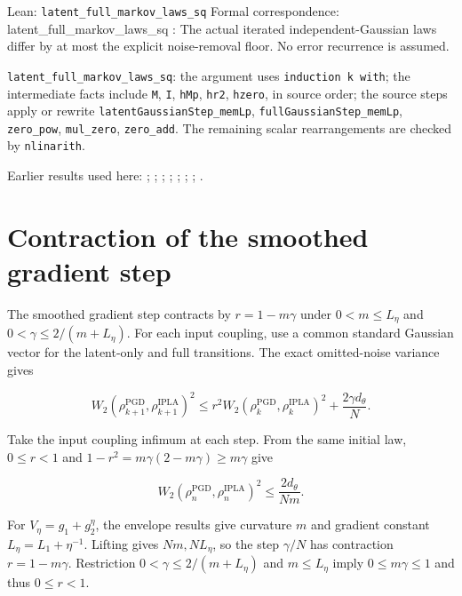 \documentclass[11pt,a4paper]{article}
\begin{document}
\begin{leanbox}{Lean: \texttt{latent\_\allowbreak{}full\_\allowbreak{}markov\_\allowbreak{}laws\_\allowbreak{}sq}}
Formal correspondence: latent\_full\_markov\_laws\_sq : The actual iterated independent-Gaussian laws differ by at most the explicit noise-removal floor. No error recurrence is assumed.



\texttt{latent\_\allowbreak{}full\_\allowbreak{}markov\_\allowbreak{}laws\_\allowbreak{}sq}: the argument uses \texttt{induction k with}; the intermediate facts include \texttt{M}, \texttt{I}, \texttt{h\allowbreak{}Mp}, \texttt{hr2}, \texttt{hzero}, in source order; the source steps apply or rewrite \texttt{latent\allowbreak{}Gaussian\allowbreak{}Step\_\allowbreak{}mem\allowbreak{}Lp}, \texttt{full\allowbreak{}Gaussian\allowbreak{}Step\_\allowbreak{}mem\allowbreak{}Lp}, \texttt{zero\_\allowbreak{}pow}, \texttt{mul\_\allowbreak{}zero}, \texttt{zero\_\allowbreak{}add}. The remaining scalar rearrangements are checked by \texttt{nlinarith}.
\end{leanbox}


Earlier results used here: \cite[Section~3.15.3]{LangevinLean2026ULASC}; \cite[Section~3.17.3]{LangevinLean2026ULASC}; \cite[Section~3.17.4]{LangevinLean2026ULASC}; \cite[Section~3.17.9]{LangevinLean2026ULASC}; \cite[Section~3.21.2]{LangevinLean2026ULASC}; \cite[Section~3.33.11]{LangevinLean2026ULASC}; \cite[Section~3.33.6]{LangevinLean2026ULASC}; \cite[Section~3.1.1]{LangevinLean2026IPLA}.

\section{\texorpdfstring{Contraction of the smoothed gradient step}{Contraction of the smoothed gradient step}}


The smoothed gradient step contracts by \(r=1-m\gamma\) under \(0<m\le L_\eta\) and \(0<\gamma\le2/(m+L_\eta)\). For each input coupling, use a common standard Gaussian vector for the latent-only and full transitions. The exact omitted-noise variance gives

\[
W_2(\rho^{\mathrm{PGD}}_{k+1},\rho^{\mathrm{IPLA}}_{k+1})^2
 \le r^2 W_2(\rho^{\mathrm{PGD}}_k,\rho^{\mathrm{IPLA}}_k)^2
       +\frac{2\gamma d_\theta}{N}.
\]

Take the input coupling infimum at each step. From the same initial law, \(0\le r<1\) and \(1-r^2=m\gamma(2-m\gamma)\ge m\gamma\) give

\[
W_2(\rho^{\mathrm{PGD}}_n,\rho^{\mathrm{IPLA}}_n)^2
 \le\frac{2d_\theta}{Nm}.
\]

For \(V_\eta=g_1+g_2^\eta\), the envelope results give curvature \(m\) and gradient constant \(L_\eta=L_1+\eta^{-1}\). Lifting gives \(Nm,NL_\eta\), so the step \(\gamma/N\) has contraction \(r=1-m\gamma\). Restriction \(0<\gamma\le2/(m+L_\eta)\) and \(m\le L_\eta\) imply \(0\le m\gamma\le1\) and thus \(0\le r<1\).
\end{document}
